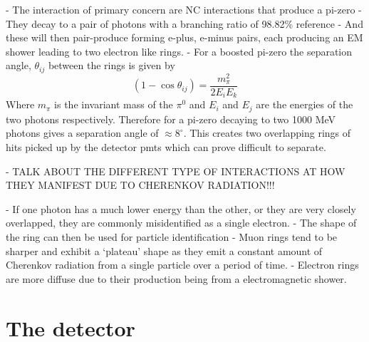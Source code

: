 - The interaction of primary concern are NC interactions that produce a pi-zero
- They decay to a pair of photons with a branching ratio of 98.82\% reference
- And these will then pair-produce forming e-plus, e-minus pairs, each producing an EM shower
leading to two electron like rings.
- For a boosted pi-zero the separation angle, $\theta_{ij}$ between the rings is given by
\begin{equation}
    (1-\cos\theta_{ij})=\frac{m_{\pi}^2}{2E_{i}E_{k}}
\end{equation}
Where $m_{\pi}$ is the invariant mass of the $\pi^{0}$ and $E_{i}$ and $E_{j}$ are the energies
of the two photons respectively.
Therefore for a pi-zero decaying to two 1000 MeV photons gives a separation angle of
$\approx 8^{\circ}$. This creates two overlapping rings of hits picked up by the detector pmts
which can prove difficult to separate.

- TALK ABOUT THE DIFFERENT TYPE OF INTERACTIONS AT HOW THEY MANIFEST DUE TO CHERENKOV RADIATION!!!

- If one photon has a much lower energy than the other, or they are very closely overlapped,
they are commonly misidentified as a single electron.
- The shape of the ring can then be used for particle identification
- Muon rings tend to be sharper and exhibit a `plateau' shape as they emit a constant amount of
Cherenkov radiation from a single particle over a period of time.
- Electron rings are more diffuse due to their production being from a electromagnetic shower.

\section{The \chipsfive detector} %
\label{sec:chips_detector} %

